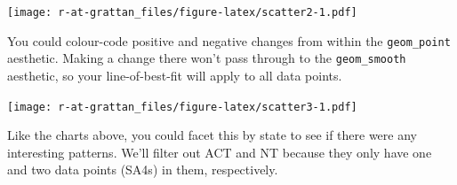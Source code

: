 \documentclass[]{book}
\newenvironment{Shaded}{\begin{snugshade}}{\end{snugshade}}
\newcommand{\CommentTok}[1]{\textcolor[rgb]{0.56,0.35,0.01}{\textit{#1}}}
\newcommand{\DataTypeTok}[1]{\textcolor[rgb]{0.13,0.29,0.53}{#1}}
\newcommand{\DecValTok}[1]{\textcolor[rgb]{0.00,0.00,0.81}{#1}}
\newcommand{\KeywordTok}[1]{\textcolor[rgb]{0.13,0.29,0.53}{\textbf{#1}}}
\newcommand{\NormalTok}[1]{#1}
\newcommand{\OperatorTok}[1]{\textcolor[rgb]{0.81,0.36,0.00}{\textbf{#1}}}
\newcommand{\StringTok}[1]{\textcolor[rgb]{0.31,0.60,0.02}{#1}}
\begin{document}
\texttt{[image: r-at-grattan\_files/figure-latex/scatter2-1.pdf]}

You could colour-code positive and negative changes from within the \texttt{geom\_point} aesthetic. Making a change there won't pass through to the \texttt{geom\_smooth} aesthetic, so your line-of-best-fit will apply to all data points.

\begin{Shaded}
\end{Shaded}

\texttt{[image: r-at-grattan\_files/figure-latex/scatter3-1.pdf]}

Like the charts above, you could facet this by state to see if there were any interesting patterns. We'll filter out ACT and NT because they only have one and two data points (SA4s) in them, respectively.
\end{document}
